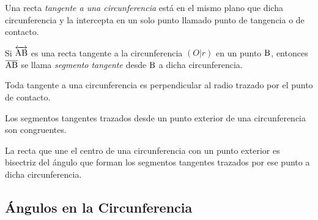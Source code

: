 \begin{definition}
    Una recta \textit{tangente a una circunferencia} está en el mismo plano que dicha circunferencia y la intercepta en un solo punto llamado punto de tangencia o de contacto.

    \begin{figure}[!h]
        \centering
        
        \label{fig:circ-tangente}
    \end{figure}
    
\end{definition}

\begin{definition}
    Si $\overleftrightarrow{\rm AB}$ es una recta tangente a la circunferencia $(O|r)$ en un punto $\rm B$, entonces $\overline{\rm AB}$ se llama \textit{segmento tangente} desde $\rm B$ a dicha circunferencia. 
\end{definition}

\begin{theorem}
    Toda tangente a una circunferencia es perpendicular al radio trazado por el punto de contacto.

    \begin{figure}[!h]
        \centering
        
        \label{fig:tangente-perpendicular}
    \end{figure}
    
\end{theorem}

\begin{theorem}
    Los segmentos tangentes trazados desde un punto exterior de una circunferencia son congruentes.
\end{theorem}

\begin{theorem}
    La recta que une el centro de una circunferencia con un punto exterior es bisectriz del ángulo que forman los segmentos tangentes trazados por ese punto a dicha circunferencia.
\end{theorem}

\begin{figure}[!h]
    \centering
    
    \label{fig:recta-bisectriz}
\end{figure}

\clearpage

\subsection{Ángulos en la Circunferencia}

